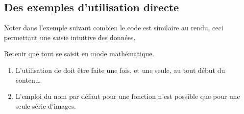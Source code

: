 \documentclass{tutodoc}
\begin{document}
\subsection{Des exemples d'utilisation directe}

\begin{tdocexa}
    Noter dans l'exemple suivant combien le code est similaire au rendu, ceci permettant une saisie intuitive des données.

\end{tdocexa}


\begin{tdocimp}
	Retenir que tout se saisit en mode mathématique.
\end{tdocimp}


\begin{tdocwarn}
	\begin{enumerate}[wide]
		\item L'utilisation de  doit être faite une fois, et une seule, au tout début du contenu.

		\item L'emploi du nom par défaut pour une fonction n'est possible que pour une seule série d'images.
	\end{enumerate}
\end{tdocwarn}




\begin{tdocexa}
    \leavevmode

\end{tdocexa}




\begin{tdocexa}
    \leavevmode

\end{tdocexa}




\begin{tdocexa}
    \leavevmode

\end{tdocexa}
\end{document}
